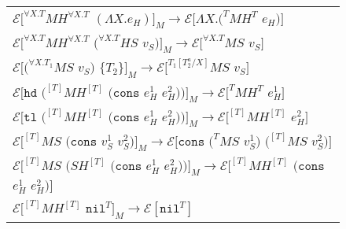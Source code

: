 \begin{figure}[ph!]
\begin{tabular}{l}
\vspace{5pt}

$\mathscr{E}[^{\forall X.T}MH^{\forall X.T}$ $(\Lambda X.e_{H})]_{M}\rightarrow\mathscr{E}[\Lambda X.(^{T}MH^{T}$ $e_{H})]$ \\

\vspace{5pt}

$\mathscr{E}[^{\forall X.T}MH^{\forall X.T}$ $(^{\forall X.T}HS$ $v_{S})]_{M}\rightarrow\mathscr{E}[^{\forall X.T}MS$ $v_{S}]$ \\

\vspace{5pt}

$\mathscr{E}[(^{\forall X.T_{1}}MS$ $v_{S})$ $\lbrace T_{2}\rbrace]_{M}\rightarrow\mathscr{E}[^{T_{1}[T^{a}_{2}/X]}MS$ $v_{S}]$ \\

\vspace{5pt}

$\mathscr{E}[\mathtt{hd}$ $(^{[T]}MH^{[T]}$ $(\mathtt{cons}$ $e_{H}^{1}$ $e_{H}^{2}))]_{M}\rightarrow\mathscr{E}[^{T}MH^{T}$ $e_{H}^{1}]$ \\

\vspace{5pt}

$\mathscr{E}[\mathtt{tl}$ $(^{[T]}MH^{[T]}$ $(\mathtt{cons}$ $e_{H}^{1}$ $e_{H}^{2}))]_{M}\rightarrow\mathscr{E}[^{[T]}MH^{[T]}$ $e_{H}^{2}]$ \\

\vspace{5pt}

$\mathscr{E}[^{[T]}MS$ $(\mathtt{cons}$ $v_{S}^{1}$ $v_{S}^{2})]_{M}\rightarrow\mathscr{E}[\mathtt{cons}$ $(^{T}MS$ $v_{S}^{1})$ $(^{[T]}MS$ $v_{S}^{2})]$ \\

\vspace{5pt}

$\mathscr{E}[^{[T]}MS$ $(SH^{[T]}$ $(\mathtt{cons}$ $e_{H}^{1}$ $e_{H}^{2}))]_{M}\rightarrow\mathscr{E}[^{[T]}MH^{[T]}$ $(\mathtt{cons}$ $e_{H}^{1}$ $e_{H}^{2})]$ \\

\vspace{5pt}

$\mathscr{E}[^{[T]}MH^{[T]}$ $\mathtt{nil}^{T}]_{M}\rightarrow\mathscr{E}[\mathtt{nil}^{T}]$ \\


\end{tabular}
\end{figure}
